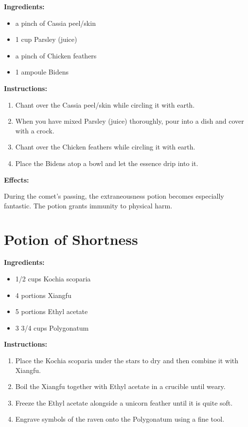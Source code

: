 \documentclass{article}
\begin{document}
\textbf{Ingredients:}

\begin{itemize}
  \item a pinch of Cassia peel/skin
  \item 1 cup Parsley (juice)
  \item a pinch of Chicken feathers
  \item 1 ampoule Bidens
\end{itemize}

\textbf{Instructions:}

\begin{enumerate}
  \item Chant over the Cassia peel/skin while circling it with earth.
  \item When you have mixed Parsley (juice) thoroughly, pour into a dish and cover with a crock.
  \item Chant over the Chicken feathers while circling it with earth.
  \item Place the Bidens atop a bowl and let the essence drip into it.
\end{enumerate}

\textbf{Effects:}

During the comet’s passing, the extraneousness potion becomes especially fantastic. The potion grants immunity to physical harm.

\newpage
\section*{Potion of Shortness}

\textbf{Ingredients:}

\begin{itemize}
  \item 1/2 cups Kochia scoparia
  \item 4 portions Xiangfu
  \item 5 portions Ethyl acetate
  \item 3 3/4 cups Polygonatum
\end{itemize}

\textbf{Instructions:}

\begin{enumerate}
  \item Place the Kochia scoparia under the stars to dry and then combine it with Xiangfu.
  \item Boil the Xiangfu together with Ethyl acetate in a crucible until weary.
  \item Freeze the Ethyl acetate alongside a unicorn feather until it is quite soft.
  \item Engrave symbols of the raven onto the Polygonatum using a fine tool.
\end{enumerate}
\end{document}
